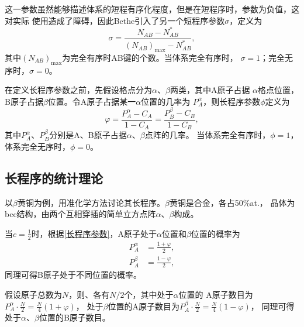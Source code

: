             这一参数虽然能够描述体系的短程有序化程度，但是在短程序时，参数为负值，这对实际
            使用造成了障碍，因此Bethe引入了另一个短程序参数$\sigma$，定义为
            \begin{equation}
                \sigma=\frac{N_{A B}-N_{A B}^{*}}{\left(N_{A B}\right)_{\max }-N_{A B}^{*}},
            \end{equation}
            其中$\left( N_{AB} \right)_{\mathrm{max}}$为完全有序时AB键的个数。当体系完全有序时，
            $\sigma=1$；完全无序时，$\sigma=0$。

            在定义长程序参数之前，先假设格点分为$\alpha$、$\beta$两类，其中A原子占据
            $\alpha$格点位置，B原子占据$\beta$位置。令A原子占据某一$\alpha$位置的几率为
            $P_A^\alpha$，则长程序参数$\phi$定义为
            \begin{equation}
                \varphi=\frac{P_{A}^{\alpha}-C_{A}}{1-C_{A}}=\frac{P_{B}^{\beta}-C_{B}}{1-C_{B}}\label{长程序参数},
            \end{equation}
            其中$P_A^\alpha$、$P_B^\beta$分别是A、B原子占据$\alpha$、$\beta$点阵的几率。
            当体系完全有序时，$\phi=1$，体系完全无序时，$\phi=0$。
        \subsection{长程序的统计理论}
            以$\beta$黄铜为例，用准化学方法讨论其长程序。$\beta$黄铜是合金，各占50\%at.，
            晶体为bcc结构，由两个互相穿插的简单立方点阵$\alpha$、$\beta$构成。

            当$c=\frac{1}{2}$时，根据\autoref{长程序参数}，A原子处于$\alpha$位置和$\beta$位置的概率为
            \begin{align}
                P_{A}^{\alpha}&=\frac{1+\varphi}{2},\\
                P_{A}^{\beta}&=\frac{1-\varphi}{2},
            \end{align}
            同理可得B原子处于不同位置的概率。

            假设原子总数为$N$，则、各有$N/2$个，其中处于$\alpha$位置的
            A原子数目为$P_{A}^{\alpha} \cdot \frac{N}{2}=\frac{N}{4}(1+\varphi)$，
            处于$\beta$位置的A原子数目为$P_{A}^{\beta} \cdot \frac{N}{2}=\frac{N}{4}(1-\varphi)$，
            同理可得处于$\alpha$、$\beta$位置的B原子数目。

